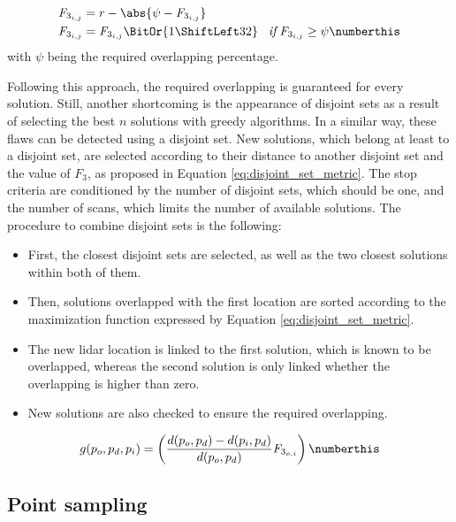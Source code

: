 \begin{align*}
    \textit{F}_{3_{i, j}} &= r - \abs{\psi - \textit{F}_{3_{i, j}}}\\
    \textit{F}_{3_{i, j}} &= \textit{F}_{3_{i, j}} \BitOr{1 \ShiftLeft 32} \hspace{3mm} \textit{if} \hspace{1mm}  \textit{F}_{3_{i, j}} \geq \psi
    \numberthis \label{eq:loo}
\end{align*}
with $\psi$ being the required overlapping percentage.

Following this approach, the required overlapping is guaranteed for every solution. Still, another shortcoming is the appearance of disjoint sets as a result of selecting the best $n$ solutions with greedy algorithms. In a similar way, these flaws can be detected using a disjoint set. New solutions, which belong at least to a disjoint set, are selected according to their distance to another disjoint set and the value of $F_3$, as proposed in Equation \ref{eq:disjoint_set_metric}. The stop criteria are conditioned by the number of disjoint sets, which should be one, and the number of scans, which limits the number of available solutions. The procedure to combine disjoint sets is the following:
\begin{itemize}
    \item First, the closest disjoint sets are selected, as well as the two closest solutions within both of them.
    \item Then, solutions overlapped with the first location are sorted according to the maximization function expressed by Equation \ref{eq:disjoint_set_metric}. 
    \item The new \acrshort{lidar} location is linked to the first solution, which is known to be overlapped, whereas the second solution is only linked whether the overlapping is higher than zero. 
    \item New solutions are also checked to ensure the required overlapping.
\end{itemize}
\begin{align*}
    g(p_o, p_d, p_i) = \left(\frac{d(p_o, p_d) - d(p_i, p_d)}{d(p_o, p_d)} \textit{F}_{3_{o, i}}\right)
    \numberthis \label{eq:disjoint_set_metric}
\end{align*}

\subsection{Point sampling}


